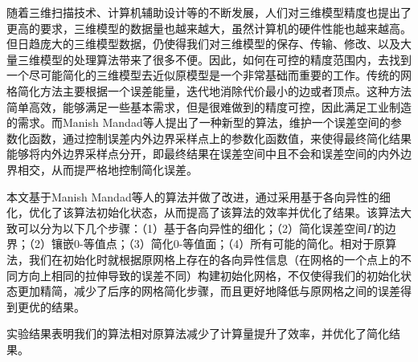 
\begin{cabstract}
随着三维扫描技术、计算机辅助设计等的不断发展，人们对三维模型精度也提出了更高的要求，三维模型的数据量也越来越大，虽然计算机的硬件性能也越来越高。但日趋庞大的三维模型数据，仍使得我们对三维模型的保存、传输、修改、以及大量三维模型的处理算法带来了很多不便。因此，如何在可控的精度范围内，去找到一个尽可能简化的三维模型去近似原模型是一个非常基础而重要的工作。传统的网格简化方法主要根据一个误差能量，迭代地消除代价最小的边或者顶点。这种方法简单高效，能够满足一些基本需求，但是很难做到的精度可控，因此满足工业制造的需求。而Manish Mandad等人提出了一种新型的算法\cite{isotopic-appro}，维护一个误差空间的参数化函数，通过控制误差内外边界采样点上的参数化函数值，来使得最终简化结果能够将内外边界采样点分开，即最终结果在误差空间中且不会和误差空间的内外边界相交，从而提严格地控制简化误差。\par
本文基于Manish Mandad等人的算法\cite{isotopic-appro}并做了改进，通过采用基于各向异性的细化，优化了该算法初始化状态，从而提高了该算法的效率并优化了结果。该算法大致可以分为以下几个步骤：（1）基于各向异性的细化；（2）简化误差空间$\Gamma$的边界；（2）镶嵌0-等值点；（3）简化0-等值面；（4）所有可能的简化。相对于原算法，我们在初始化时就根据原网格上存在的各向异性信息（在网格的一个点上的不同方向上相同的拉伸导致的误差不同）构建初始化网格，不仅使得我们的初始化状态更加精简，减少了后序的网格简化步骤，而且更好地降低与原网格之间的误差得到更优的结果。\par
实验结果表明我们的算法相对原算法减少了计算量提升了效率，并优化了简化结果。
\end{cabstract}

